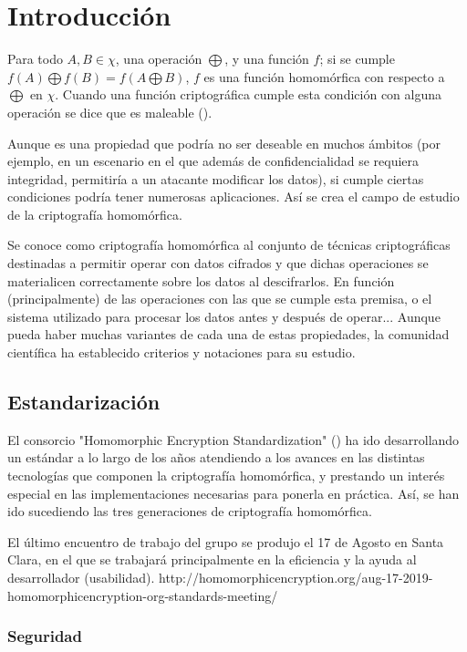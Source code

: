 \chapter{Introducción}
\label{chap:intro}

Para todo $ A,B \in \chi{} $, una operación $ \bigoplus $, y una función $f$; si se cumple $ f(A) \bigoplus f(B) = f(A \bigoplus B)$, $ f $ es una función homomórfica con respecto a $ \bigoplus $ en $ \chi{} $. Cuando una función criptográfica cumple esta condición con alguna operación se dice que es maleable (\cite{dolev_non-malleable_1991}). 

Aunque es una propiedad que podría no ser deseable en muchos ámbitos (por ejemplo, en un escenario en el que además de confidencialidad se requiera integridad, permitiría a un atacante modificar los datos), si cumple ciertas condiciones podría tener numerosas aplicaciones. Así se crea el campo de estudio de la criptografía homomórfica.

Se conoce como criptografía homomórfica al conjunto de técnicas criptográficas destinadas a permitir operar con datos cifrados y que dichas operaciones se materialicen correctamente sobre los datos al descifrarlos. En función (principalmente) de las operaciones con las que se cumple esta premisa, o el sistema utilizado para procesar los datos antes y después de operar... Aunque pueda haber muchas variantes de cada una de estas propiedades, la comunidad científica ha establecido criterios y notaciones para su estudio. 

\section{Estandarización}

El consorcio "Homomorphic Encryption Standardization" (\cite{noauthor_homomorphic_nodate-1}) ha ido desarrollando un estándar a lo largo de los años atendiendo a los avances en las distintas tecnologías que componen la criptografía homomórfica, y prestando un interés especial en las implementaciones necesarias para ponerla en práctica. Así, se han ido sucediendo las tres generaciones de criptografía homomórfica.

El último encuentro de trabajo del grupo se produjo el 17 de Agosto en Santa Clara, en el que se trabajará principalmente en la eficiencia y la ayuda al desarrollador (usabilidad). http://homomorphicencryption.org/aug-17-2019-homomorphicencryption-org-standards-meeting/

\subsection{Seguridad}

